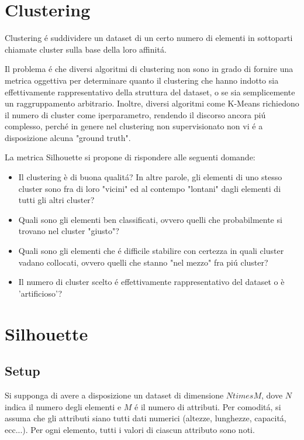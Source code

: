 \documentclass[italian]{article}
\begin{document}
\section{Clustering}

	Clustering é suddividere un dataset di un certo numero di elementi
	in sottoparti chiamate cluster sulla base della loro affinitá.

	Il problema é che diversi algoritmi di clustering non sono in grado di
	fornire una metrica oggettiva per determinare quanto il clustering che
	hanno indotto sia effettivamente rappresentativo della struttura del
	dataset, o se sia semplicemente un raggruppamento arbitrario. Inoltre,
	diversi algoritmi come K-Means richiedono il numero di cluster come
	iperparametro, rendendo il discorso ancora piú complesso, perché in
	genere nel clustering non supervisionato non vi é a disposizione
	alcuna "ground truth".

	La metrica Silhouette si propone di rispondere alle seguenti domande:

	\begin{itemize}
		\item
		Il clustering è di buona qualitá? In altre parole, gli elementi di
		uno stesso cluster sono fra di loro "vicini" ed al contempo "lontani"
		dagli elementi di tutti gli altri cluster?
		\item
		Quali sono gli elementi ben classificati, ovvero quelli che probabilmente
		si trovano nel cluster "giusto"?
		\item
		Quali sono gli elementi che é difficile stabilire con certezza in quali
		cluster vadano collocati, ovvero quelli che stanno "nel mezzo" fra piú
		cluster?
		\item
		Il numero di cluster scelto é effettivamente rappresentativo del dataset
		o è 'artificioso'?
	\end{itemize}

\section{Silhouette}

	\subsection{Setup}

		Si supponga di avere a disposizione un dataset di dimensione
		$N times M$, dove $N$ indica il numero degli elementi e $M$ é
		il numero di attributi. Per comoditá, si assuma che gli attributi
		siano tutti dati numerici (altezze, lunghezze, capacitá, ecc...).
		Per ogni elemento, tutti i valori di ciascun attributo sono noti.
\end{document}
